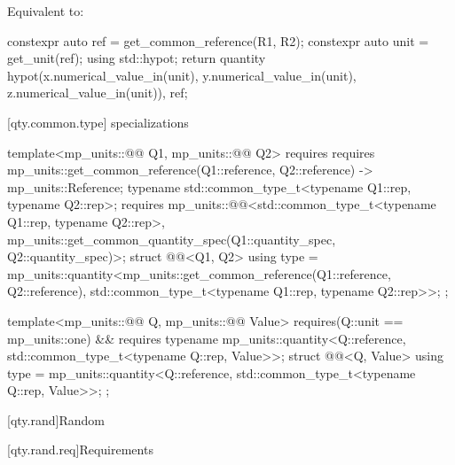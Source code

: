 \begin{itemdescr}
\pnum
\effects
Equivalent to:
\begin{codeblock}
constexpr auto ref = get_common_reference(R1, R2);
constexpr auto unit = get_unit(ref);
using std::hypot;
return quantity{
  hypot(x.numerical_value_in(unit), y.numerical_value_in(unit), z.numerical_value_in(unit)),
  ref};
\end{codeblock}
\end{itemdescr}

[qty.common.type]{ specializations}

\begin{codeblock}
template<mp_units::@@ Q1, mp_units::@@ Q2>
  requires requires {
    { mp_units::get_common_reference(Q1::reference, Q2::reference) } -> mp_units::Reference;
    typename std::common_type_t<typename Q1::rep, typename Q2::rep>;
    requires mp_units::@@<std::common_type_t<typename Q1::rep, typename Q2::rep>,
                                        mp_units::get_common_quantity_spec(Q1::quantity_spec,
                                                                           Q2::quantity_spec)>;
  }
struct @@<Q1, Q2> {
  using type = mp_units::quantity<mp_units::get_common_reference(Q1::reference, Q2::reference),
                                  std::common_type_t<typename Q1::rep, typename Q2::rep>>;
};

template<mp_units::@@ Q, mp_units::@@ Value>
  requires(Q::unit == mp_units::one) && requires {
    typename mp_units::quantity<Q::reference, std::common_type_t<typename Q::rep, Value>>;
  }
struct @@<Q, Value> {
  using type = mp_units::quantity<Q::reference, std::common_type_t<typename Q::rep, Value>>;
};
\end{codeblock}

[qty.rand]{Random}

[qty.rand.req]{Requirements}

\newcommand{\indexrand}[1]{%
\indexlibrarymemberx{uniform_int_distribution}{#1}%
\indexlibrarymemberx{uniform_real_distribution}{#1}%
\indexlibrarymemberx{binomial_distribution}{#1}%
\indexlibrarymemberx{negative_binomial_distribution}{#1}%
\indexlibrarymemberx{geometric_distribution}{#1}%
\indexlibrarymemberx{poisson_distribution}{#1}%
\indexlibrarymemberx{exponential_distribution}{#1}%
\indexlibrarymemberx{gamma_distribution}{#1}%
\indexlibrarymemberx{weibull_distribution}{#1}%
\indexlibrarymemberx{extreme_value_distribution}{#1}%
\indexlibrarymemberx{normal_distribution}{#1}%
\indexlibrarymemberx{lognormal_distribution}{#1}%
\indexlibrarymemberx{chi_squared_distribution}{#1}%
\indexlibrarymemberx{cauchy_distribution}{#1}%
\indexlibrarymemberx{fisher_f_distribution}{#1}%
\indexlibrarymemberx{student_t_distribution}{#1}%
\indexlibrarymemberx{discrete_distribution}{#1}%
\indexlibrarymemberx{piecewise_constant_distribution}{#1}%
\indexlibrarymemberx{piecewise_linear_distribution}{#1}%
}

